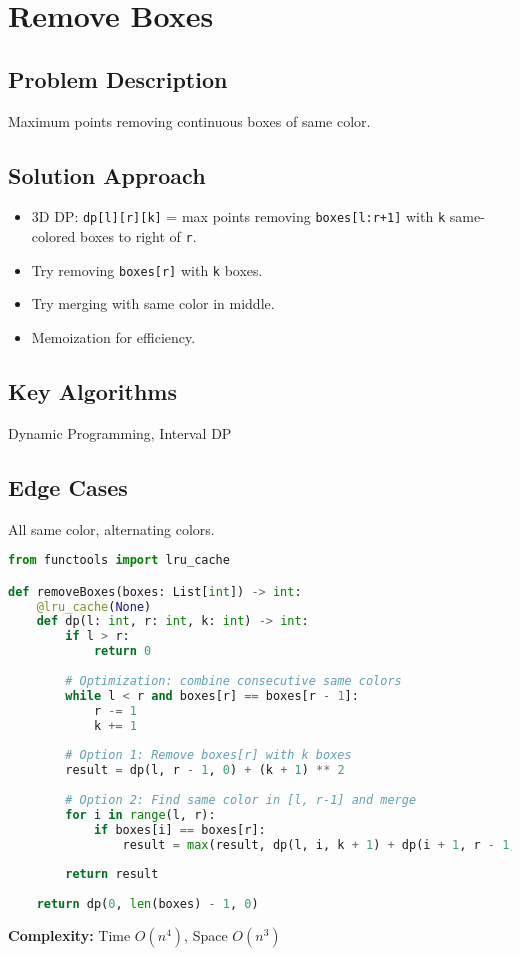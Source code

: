 \documentclass[10pt, a4paper]{article}
\begin{document}
\section{Remove Boxes}
\subsection*{Problem Description}
Maximum points removing continuous boxes of same color.

\subsection*{Solution Approach}
\begin{itemize}
    \item 3D DP: \texttt{dp[l][r][k]} = max points removing \texttt{boxes[l:r+1]} with \texttt{k} same-colored boxes to right of \texttt{r}.
    \item Try removing \texttt{boxes[r]} with \texttt{k} boxes.
    \item Try merging with same color in middle.
    \item Memoization for efficiency.
\end{itemize}

\subsection*{Key Algorithms}
Dynamic Programming, Interval DP

\subsection*{Edge Cases}
All same color, alternating colors.

\begin{lstlisting}[language=Python]
from functools import lru_cache

def removeBoxes(boxes: List[int]) -> int:
    @lru_cache(None)
    def dp(l: int, r: int, k: int) -> int:
        if l > r:
            return 0
        
        # Optimization: combine consecutive same colors
        while l < r and boxes[r] == boxes[r - 1]:
            r -= 1
            k += 1
        
        # Option 1: Remove boxes[r] with k boxes
        result = dp(l, r - 1, 0) + (k + 1) ** 2
        
        # Option 2: Find same color in [l, r-1] and merge
        for i in range(l, r):
            if boxes[i] == boxes[r]:
                result = max(result, dp(l, i, k + 1) + dp(i + 1, r - 1, 0))
        
        return result
    
    return dp(0, len(boxes) - 1, 0)
\end{lstlisting}
\textbf{Complexity:} Time $O(n^4)$, Space $O(n^3)$
\end{document}
